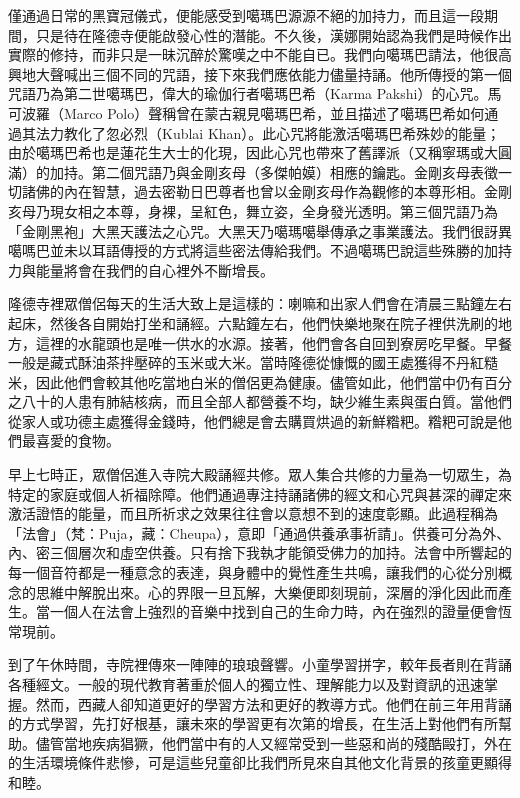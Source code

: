僅通過日常的黑寶冠儀式，便能感受到噶瑪巴源源不絕的加持力，而且這一段期間，只是待在隆德寺便能啟發心性的潛能。不久後，漢娜開始認為我們是時候作出實際的修持，而非只是一昧沉醉於驚嘆之中不能自已。我們向噶瑪巴請法，他很高興地大聲喊出三個不同的咒語，接下來我們應依能力儘量持誦。他所傳授的第一個咒語乃為第二世噶瑪巴，偉大的瑜伽行者噶瑪巴希（Karma
Pakshi）的心咒。馬可波羅（Marco
Polo）聲稱曾在蒙古親見噶瑪巴希，並且描述了噶瑪巴希如何通過其法力教化了忽必烈（Kublai
Khan）。此心咒將能激活噶瑪巴希殊妙的能量；由於噶瑪巴希也是蓮花生大士的化現，因此心咒也帶來了舊譯派（又稱寧瑪或大圓滿）的加持。第二個咒語乃與金剛亥母（多傑帕嫫）相應的鑰匙。金剛亥母表徵一切諸佛的內在智慧，過去密勒日巴尊者也曾以金剛亥母作為觀修的本尊形相。金剛亥母乃現女相之本尊，身裸，呈紅色，舞立姿，全身發光透明。第三個咒語乃為「金剛黑袍」大黑天護法之心咒。大黑天乃噶瑪噶舉傳承之事業護法。我們很訝異噶嗎巴並未以耳語傳授的方式將這些密法傳給我們。不過噶瑪巴說這些殊勝的加持力與能量將會在我們的自心裡外不斷增長。

隆德寺裡眾僧侶每天的生活大致上是這樣的：喇嘛和出家人們會在清晨三點鐘左右起床，然後各自開始打坐和誦經。六點鐘左右，他們快樂地聚在院子裡供洗刷的地方，這裡的水龍頭也是唯一供水的水源。接著，他們會各自回到寮房吃早餐。早餐一般是藏式酥油茶拌壓碎的玉米或大米。當時隆德從慷慨的國王處獲得不丹紅糙米，因此他們會較其他吃當地白米的僧侶更為健康。儘管如此，他們當中仍有百分之八十的人患有肺結核病，而且全部人都營養不均，缺少維生素與蛋白質。當他們從家人或功德主處獲得金錢時，他們總是會去購買烘過的新鮮糌粑。糌粑可說是他們最喜愛的食物。

早上七時正，眾僧侶進入寺院大殿誦經共修。眾人集合共修的力量為一切眾生，為特定的家庭或個人祈福除障。他們通過專注持誦諸佛的經文和心咒與甚深的禪定來激活證悟的能量，而且所祈求之效果往往會以意想不到的速度彰顯。此過程稱為「法會」（梵：Puja，藏：Cheupa），意即「通過供養承事祈請」。供養可分為外、內、密三個層次和虛空供養。只有捨下我執才能領受佛力的加持。法會中所響起的每一個音符都是一種意念的表達，與身體中的覺性產生共鳴，讓我們的心從分別概念的思維中解脫出來。心的界限一旦瓦解，大樂便即刻現前，深層的淨化因此而產生。當一個人在法會上強烈的音樂中找到自己的生命力時，內在強烈的證量便會恆常現前。

到了午休時間，寺院裡傳來一陣陣的琅琅聲響。小童學習拼字，較年長者則在背誦各種經文。一般的現代教育著重於個人的獨立性、理解能力以及對資訊的迅速掌握。然而，西藏人卻知道更好的學習方法和更好的教導方式。他們在前三年用背誦的方式學習，先打好根基，讓未來的學習更有次第的增長，在生活上對他們有所幫助。儘管當地疾病猖獗，他們當中有的人又經常受到一些惡和尚的殘酷毆打，外在的生活環境條件悲慘，可是這些兒童卻比我們所見來自其他文化背景的孩童更顯得和睦。

